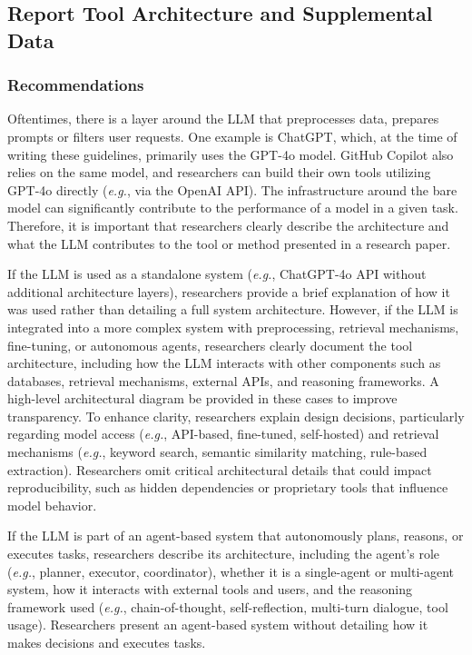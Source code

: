 



\subsection{Report Tool Architecture and Supplemental Data}

\subsubsection{Recommendations}

Oftentimes, there is a layer around the LLM that preprocesses data, prepares prompts or filters user requests. One example is ChatGPT, which, at the time of writing these guidelines, primarily uses the GPT-4o model. GitHub Copilot also relies on the same model, and researchers can build their own tools utilizing GPT-4o directly (\textit{e.g.}, via the OpenAI API). The infrastructure around the bare model can significantly contribute to the performance of a model in a given task.
Therefore, it is important that researchers clearly describe the architecture and what the LLM contributes to the tool or method presented in a research paper.


If the LLM is used as a standalone system (\textit{e.g.}, ChatGPT-4o API without additional architecture layers), researchers \should provide a brief explanation of how it was used rather than detailing a full system architecture. However, if the LLM is integrated into a more complex system with preprocessing, retrieval mechanisms, fine-tuning, or autonomous agents, researchers \must clearly document the tool architecture, including how the LLM interacts with other components such as databases, retrieval mechanisms, external APIs, and reasoning frameworks. A high-level architectural diagram \should be provided in these cases to improve transparency. To enhance clarity, researchers \should explain design decisions, particularly regarding model access (\textit{e.g.}, API-based, fine-tuned, self-hosted) and retrieval mechanisms (\textit{e.g.}, keyword search, semantic similarity matching, rule-based extraction). Researchers \mustnot omit critical architectural details that could impact reproducibility, such as hidden dependencies or proprietary tools that influence model behavior.


If the LLM is part of an agent-based system that autonomously plans, reasons, or executes tasks, researchers \must describe its architecture, including the agent's role (\textit{e.g.}, planner, executor, coordinator), whether it is a single-agent or multi-agent system, how it interacts with external tools and users, and the reasoning framework used (\textit{e.g.}, chain-of-thought, self-reflection, multi-turn dialogue, tool usage). Researchers \mustnot present an agent-based system without detailing how it makes decisions and executes tasks.


